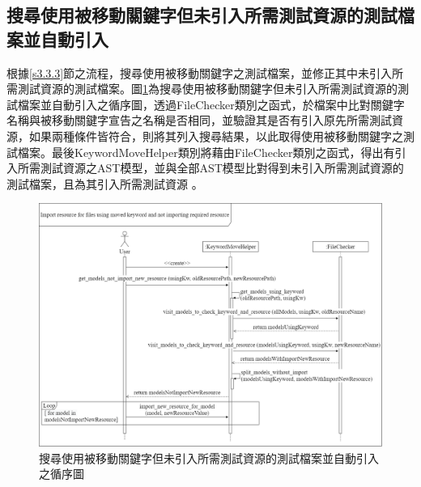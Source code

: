 \subsection{搜尋使用被移動關鍵字但未引入所需測試資源的測試檔案並自動引入}
%
\indent
根據\ref{s3.3.3}節之流程，搜尋使用被移動關鍵字之測試檔案，並修正其中未引入所需測試資源的測試檔案。圖\ref{f4.8}為搜尋使用被移動關鍵字但未引入所需測試資源的測試檔案並自動引入之循序圖，透過FileChecker類別之函式，於檔案中比對關鍵字名稱與被移動關鍵字宣告之名稱是否相同，並驗證其是否有引入原先所需測試資源，如果兩種條件皆符合，則將其列入搜尋結果，以此取得使用被移動關鍵字之測試檔案。最後KeywordMoveHelper類別將藉由FileChecker類別之函式，得出有引入所需測試資源之AST模型，並與全部AST模型比對得到未引入所需測試資源的測試檔案，且為其引入所需測試資源	。

\begin{figure}[H]
	\centering
    \includegraphics[width=1.0\textwidth]{picture/ch4/sequenceDiagram/Import_resource_for_files_using_moved_keyword_and_not_importing_required_resource_sequence_diagram.png}
    \caption{搜尋使用被移動關鍵字但未引入所需測試資源的測試檔案並自動引入之循序圖}
    \label{f4.8}
\end{figure}

